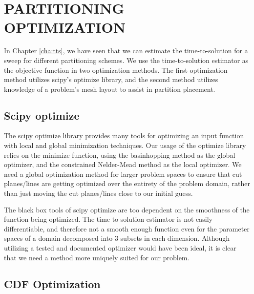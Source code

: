%
%
%
%



\chapter{PARTITIONING OPTIMIZATION \label{cha:optimization}}
In Chapter \ref{cha:tts}, we have seen that we can estimate the time-to-solution for a sweep for different partitioning schemes.
We use the time-to-solution estimator as the objective function in two optimization methods.
The first optimization method utilizes scipy's optimize library, and the second method utilizes knowledge of a problem's mesh layout to assist in partition placement.
\section{Scipy optimize}
The scipy optimize library \cite{scipy} provides many tools for optimizing an input function with local and global minimization techniques.
Our usage of the optimize library relies on the minimize function, using the basinhopping \cite{basinhoppingwales} method as the global optimizer, and the constrained Nelder-Mead method as the local optimizer.
We need a global optimization method for larger problem spaces to ensure that cut planes/lines are getting optimized over the entirety of the problem domain, rather than just moving the cut planes/lines close to our initial guess.

The black box tools of scipy optimize are too dependent on the smoothness of the function being optimized.
The time-to-solution estimator is not easily differentiable, and therefore not a smooth enough function even for the parameter spaces of a domain decomposed into 3 subsets in each dimension.
Although utilizing a tested and documented optimizer would have been ideal, it is clear that we need a method more uniquely suited for our problem.

\section{CDF Optimization}

